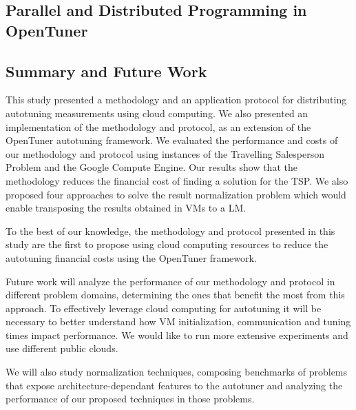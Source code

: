 \subsection{Parallel and Distributed Programming in OpenTuner}
\label{subsec:parallel}

\subsection{Summary and Future Work}
\label{sec:cloud-conclusion}

This study presented a methodology and an application protocol for distributing
autotuning measurements using cloud computing. We also presented an
implementation of the methodology and protocol, as an extension of the
OpenTuner autotuning framework.  We evaluated the performance and costs of our
methodology and protocol using instances of the Travelling Salesperson Problem
and the Google Compute Engine.  Our results show that the methodology reduces
the financial cost of finding a solution for the TSP.  We also proposed four
approaches to solve the result normalization problem which would enable
transposing the results obtained in VMs to a LM.

To the best of our knowledge, the methodology and protocol presented in this
study are the first to propose using cloud computing resources to reduce the
autotuning financial costs using the OpenTuner framework.

Future work will analyze the performance of our methodology and protocol in
different problem domains, determining the ones that benefit the most from this
approach. To effectively leverage cloud computing for autotuning it will be
necessary to better understand how VM initialization, communication and tuning
times impact performance. We would like to run more extensive experiments and
use different public clouds.

We will also study normalization techniques, composing benchmarks of problems
that expose architecture-dependant features to the autotuner and analyzing the
performance of our proposed techniques in those problems.
